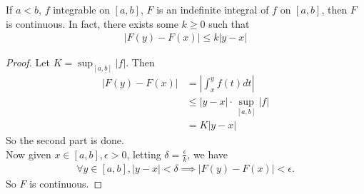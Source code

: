 \documentclass[a4paper]{article}
\begin{document}
\begin{thm}
If $a<b$, $f$ integrable on $\left[a,b\right]$, $F$ is an indefinite integral of $f$ on $\left[a,b\right]$, then $F$ is continuous. In fact, there exists some $k\geq 0$ such that
\begin{equation*}
\begin{aligned}
|F\left(y\right) - F\left(x\right)| \leq k |y-x|
\end{aligned}
\end{equation*}
\begin{proof}
Let $K=\sup_{\left[a,b\right]} |f|$. Then
\begin{equation*}
\begin{aligned}
|F\left(y\right) - F\left(x\right)| &= |\int_x^y f\left(t\right) dt|\\
&\leq |y-x| \cdot \sup_{\left[a,b\right]} |f|\\
&=K|y-x|
\end{aligned}
\end{equation*}
So the second part is done.\\
Now given $x\in\left[a,b\right], \epsilon > 0$, letting $\delta = \frac{\epsilon}{k}$, we have
\begin{equation*}
\begin{aligned}
\forall y\in\left[a,b\right], |y-x|<\delta \implies |F\left(y\right) - F\left(x\right)| < \epsilon.
\end{aligned}
\end{equation*}
So $F$ is continuous.
\end{proof}
\end{thm}
\end{document}

